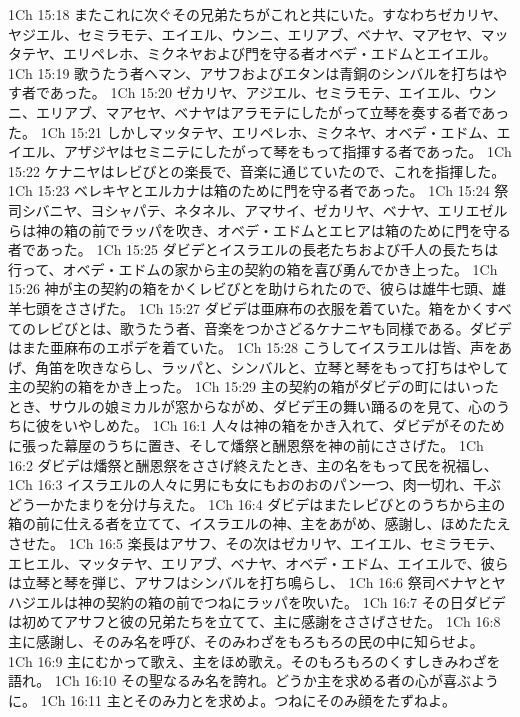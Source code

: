 1Ch 15:18  またこれに次ぐその兄弟たちがこれと共にいた。すなわちゼカリヤ、ヤジエル、セミラモテ、エイエル、ウンニ、エリアブ、ベナヤ、マアセヤ、マッタテヤ、エリペレホ、ミクネヤおよび門を守る者オベデ・エドムとエイエル。
1Ch 15:19  歌うたう者ヘマン、アサフおよびエタンは青銅のシンバルを打ちはやす者であった。
1Ch 15:20  ゼカリヤ、アジエル、セミラモテ、エイエル、ウンニ、エリアブ、マアセヤ、ベナヤはアラモテにしたがって立琴を奏する者であった。
1Ch 15:21  しかしマッタテヤ、エリペレホ、ミクネヤ、オベデ・エドム、エイエル、アザジヤはセミニテにしたがって琴をもって指揮する者であった。
1Ch 15:22  ケナニヤはレビびとの楽長で、音楽に通じていたので、これを指揮した。
1Ch 15:23  ベレキヤとエルカナは箱のために門を守る者であった。
1Ch 15:24  祭司シバニヤ、ヨシャパテ、ネタネル、アマサイ、ゼカリヤ、ベナヤ、エリエゼルらは神の箱の前でラッパを吹き、オベデ・エドムとエヒアは箱のために門を守る者であった。
1Ch 15:25  ダビデとイスラエルの長老たちおよび千人の長たちは行って、オベデ・エドムの家から主の契約の箱を喜び勇んでかき上った。
1Ch 15:26  神が主の契約の箱をかくレビびとを助けられたので、彼らは雄牛七頭、雄羊七頭をささげた。
1Ch 15:27  ダビデは亜麻布の衣服を着ていた。箱をかくすべてのレビびとは、歌うたう者、音楽をつかさどるケナニヤも同様である。ダビデはまた亜麻布のエポデを着ていた。
1Ch 15:28  こうしてイスラエルは皆、声をあげ、角笛を吹きならし、ラッパと、シンバルと、立琴と琴をもって打ちはやして主の契約の箱をかき上った。
1Ch 15:29  主の契約の箱がダビデの町にはいったとき、サウルの娘ミカルが窓からながめ、ダビデ王の舞い踊るのを見て、心のうちに彼をいやしめた。
1Ch 16:1  人々は神の箱をかき入れて、ダビデがそのために張った幕屋のうちに置き、そして燔祭と酬恩祭を神の前にささげた。
1Ch 16:2  ダビデは燔祭と酬恩祭をささげ終えたとき、主の名をもって民を祝福し、
1Ch 16:3  イスラエルの人々に男にも女にもおのおのパン一つ、肉一切れ、干ぶどう一かたまりを分け与えた。
1Ch 16:4  ダビデはまたレビびとのうちから主の箱の前に仕える者を立てて、イスラエルの神、主をあがめ、感謝し、ほめたたえさせた。
1Ch 16:5  楽長はアサフ、その次はゼカリヤ、エイエル、セミラモテ、エヒエル、マッタテヤ、エリアブ、ベナヤ、オベデ・エドム、エイエルで、彼らは立琴と琴を弾じ、アサフはシンバルを打ち鳴らし、
1Ch 16:6  祭司ベナヤとヤハジエルは神の契約の箱の前でつねにラッパを吹いた。
1Ch 16:7  その日ダビデは初めてアサフと彼の兄弟たちを立てて、主に感謝をささげさせた。
1Ch 16:8  主に感謝し、そのみ名を呼び、そのみわざをもろもろの民の中に知らせよ。
1Ch 16:9  主にむかって歌え、主をほめ歌え。そのもろもろのくすしきみわざを語れ。
1Ch 16:10  その聖なるみ名を誇れ。どうか主を求める者の心が喜ぶように。
1Ch 16:11  主とそのみ力とを求めよ。つねにそのみ顔をたずねよ。
